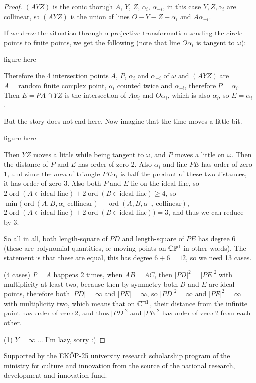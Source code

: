 \documentclass[a4paper]{article}
\newcommand{\ord}{\operatorname{ord}}
\begin{document}
\begin{proof}
    $(AYZ)$ is the conic thorugh $A$, $Y$, $Z$, $\alpha_i$, $\alpha_{-i}$, in this case $Y,Z,\alpha_i$ are collinear, so $(AYZ)$ is the union of lines $O-Y-Z-\alpha_i$ and $A\alpha_{-i}$.

    If we draw the situation through a projective transformation sending the circle points to finite points, we get the following (note that line $O\alpha_i$ is tangent to $\omega$):

    figure here

    Therefore the 4 intersection points $A$, $P$, $\alpha_i$ and $\alpha_{-i}$ of $\omega$ and $(AYZ)$ are $A=\text{random finite complex point}$, $\alpha_i$ counted twice and $\alpha_{-i}$, therefore $P=\alpha_i$. Then $E=PA\cap YZ$ is the intersection of $A\alpha_i$ and $O\alpha_i$, which is also $\alpha_i$, so $E=\alpha_i$.

    But the story does not end here. Now imagine that the time moves a little bit.
    
    figure here
    
    Then $YZ$ moves a little while being tangent to $\omega$, and $P$ moves a little on $\omega$. Then the distance of $P$ and $E$ has order of zero 2. Also $\alpha_i$ and line $PE$ has order of zero 1, and since the area of triangle $PE\alpha_i$ is half the product of these two distances, it has order of zero 3. Also both $P$ and $E$ lie on the ideal line, so $2\ord(A\in \text{ideal line})+2\ord(B\in \text{ideal line})\ge 4$, so $\min\Big(\ord(A,B,\alpha_i\text{ collinear})+\ord(A,B,\alpha_{-i}\text{ collinear}),$$
    $$2\ord(A\in \text{ideal line})+2\ord(B\in \text{ideal line})\Big)=3$, and thus we can reduce by 3.

    So all in all, both length-square of $PD$ and length-square of $PE$ has degree 6 (these are polynomial quantities, or moving points on $\mathbb{C}\mathbb{P}^1$ in other words). The statement is that these are equal, this has degree $6+6=12$, so we need 13 cases.

    (4 cases) $P=A$ happens 2 times, when $AB=AC$, then $|PD|^2=|PE|^2$ with multiplicity at least two, because then by symmetry both $D$ and $E$ are ideal points, therefore both $|PD|=\infty$ and $|PE|=\infty$, so $|PD|^2=\infty$ and $|PE|^2=\infty$ with multiplicity two, which means that on $\mathbb{C}\mathbb{P}^1$, their distance from the infinite point has order of zero 2, and thus $|PD|^2$ and $|PE|^2$ has order of zero 2 from each other.

    (1) $Y=\infty$ ... I'm lazy, sorry :)
\end{proof}







Supported by the EKÖP-25 university research scholarship program of the ministry for culture and innovation from the source of the national research, development and innovation fund.
\end{document}
